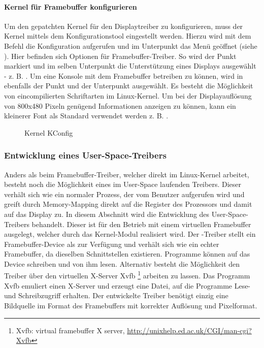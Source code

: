 \paragraph{Kernel für Framebuffer konfigurieren}
Um den gepatchten Kernel für den Displaytreiber zu konfigurieren, muss der Kernel mittels dem Konfigurationstool  eingestellt werden. 
Hierzu wird mit dem Befehl  die Konfiguration aufgerufen und im Unterpunkt  das Menü  geöffnet (siehe ). Hier befinden sich Optionen für Framebuffer-Treiber. So wird der Punkt  markiert und im selben Unterpunkt die Unterstützung eines Displays ausgewählt - z. B. . 
Um eine Konsole mit dem Framebuffer betreiben zu können, wird in  
ebenfalls der Punkt  und der Unterpunkt  ausgewählt. Es besteht die Möglichkeit von eincompilierten Schriftarten im Linux-Kernel. Um bei der Displayauflösung von 800x480 Pixeln genügend Informationen anzeigen zu können, kann ein kleinerer Font als Standard verwendet werden z. B. .
\begin{figure}[tbph]
	\centering
{}
	\caption{Kernel KConfig}
	\label{fig:kernel_config}
\end{figure}
\newpage
\subsubsection{Entwicklung eines User-Space-Treibers}
\label{cha:userspace}
Anders als beim Framebuffer-Treiber, welcher direkt im Linux-Kernel arbeitet, besteht noch die Möglichkeit eines im User-Space laufenden Treibers. Dieser verhält sich wie ein normaler Prozess, der vom Benutzer aufgerufen wird und greift durch Memory-Mapping direkt auf die Register des Prozessors und damit auf das Display zu.
In diesem Abschnitt wird die Entwicklung des User-Space-Treibers behandelt. 
Dieser ist für den Betrieb mit einem virtuellen Framebuffer ausgelegt, welcher durch das Kernel-Modul  realisiert wird. Der -Treiber stellt ein Framebuffer-Device als  zur Verfügung und verhält sich wie ein echter Framebuffer, da dieselben Schnittstellen existieren. Programme können auf das Device schreiben und von ihm lesen. Alternativ besteht die Möglichkeit den Treiber über den virtuellen X-Server Xvfb \footnote{Xvfb: virtual framebuffer X server, \url{http://unixhelp.ed.ac.uk/CGI/man-cgi?Xvfb}} arbeiten zu lassen. Das Programm Xvfb emuliert einen X-Server und erzeugt eine Datei, auf die Programme Lese- und Schreibzugriff erhalten. Der entwickelte Treiber benötigt einzig eine Bildquelle im Format des Framebuffers mit korrekter Auflösung und Pixelformat. 

